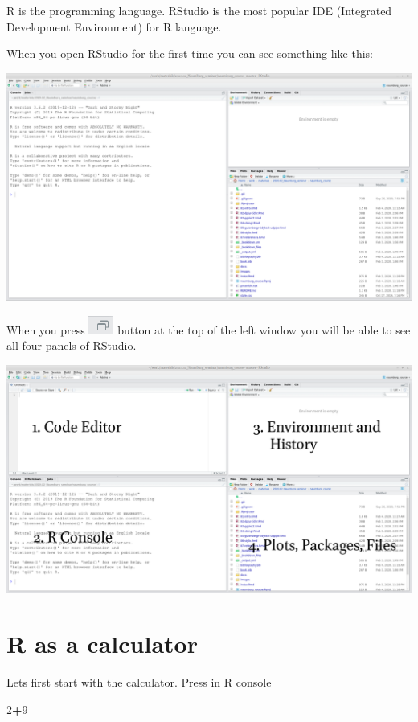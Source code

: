 \documentclass[
]{book}
\newenvironment{Shaded}{\begin{snugshade}}{\end{snugshade}}
\newcommand{\DecValTok}[1]{\textcolor[rgb]{0.00,0.00,0.81}{#1}}
\newcommand{\OperatorTok}[1]{\textcolor[rgb]{0.81,0.36,0.00}{\textbf{#1}}}
\begin{document}
R is the programming language. RStudio is the most popular IDE (Integrated Development Environment) for R language.

When you open RStudio for the first time you can see something like this:

\includegraphics{images/01.01.rstudio.png}

When you press \includegraphics{images/01.02.rstudio_button.png} button at the top of the left window you will be able to see all four panels of RStudio.

\includegraphics{images/01.03.rstudio.png}

\hypertarget{r-as-a-calculator}{%
\section{R as a calculator}\label{r-as-a-calculator}}

Lets first start with the calculator. Press in R console

\begin{Shaded}
\begin{Highlighting}[]
\DecValTok{2}\OperatorTok{+}\DecValTok{9}
\end{Highlighting}
\end{Shaded}
\end{document}
